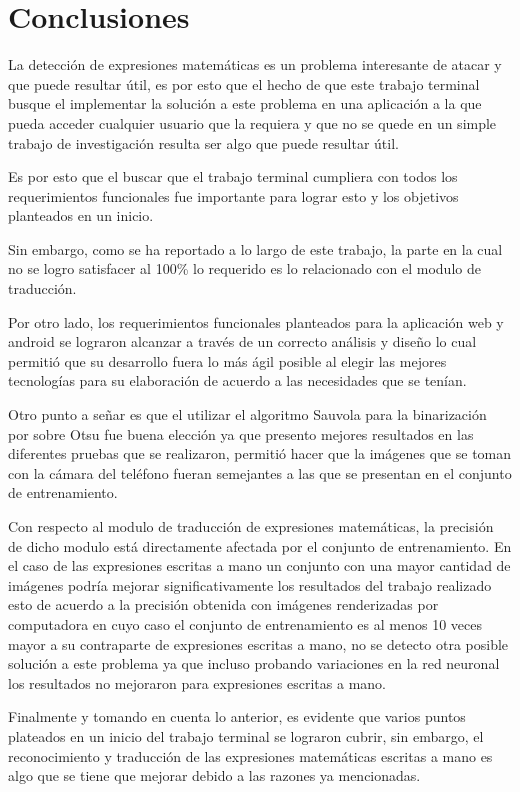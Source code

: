 \chapter{Conclusiones}
La detección de expresiones matemáticas es un problema interesante de atacar y que puede resultar útil, es por esto que el hecho de que este trabajo terminal busque el implementar la solución a este problema en una aplicación a la que pueda acceder cualquier usuario que la requiera y que no se quede en un simple trabajo de investigación resulta ser algo que puede resultar útil.

Es por esto que el buscar que el trabajo terminal cumpliera con todos los requerimientos funcionales fue importante para lograr esto y los objetivos planteados en un inicio.

Sin embargo, como se ha reportado a lo largo de este trabajo, la parte en la cual no se logro satisfacer al 100\% lo requerido es lo relacionado con el modulo de traducción.

Por otro lado, los requerimientos funcionales planteados para la aplicación web y  android se lograron alcanzar a través de un correcto análisis y diseño lo cual permitió que su desarrollo fuera lo más ágil posible al elegir las mejores tecnologías para su elaboración de acuerdo a las necesidades que se tenían.

Otro punto a señar es que el utilizar el algoritmo Sauvola para la binarización por sobre Otsu fue buena elección ya que presento mejores resultados en las diferentes pruebas que se realizaron, permitió hacer que la imágenes que se toman con la cámara del teléfono fueran semejantes a las que se presentan en el conjunto de entrenamiento.

Con respecto al modulo de traducción de expresiones matemáticas, la precisión de dicho modulo está directamente afectada por el conjunto de entrenamiento. En el caso de las expresiones escritas a mano un conjunto con una mayor cantidad de imágenes podría mejorar significativamente los resultados del trabajo realizado esto de acuerdo a la precisión obtenida con imágenes renderizadas por computadora en cuyo caso el conjunto de entrenamiento es al menos 10 veces mayor a su contraparte de expresiones escritas a mano, no se detecto otra posible solución a este problema ya que incluso probando variaciones en la red neuronal los resultados no mejoraron para expresiones escritas a mano.

Finalmente y tomando en cuenta lo anterior, es evidente que varios puntos plateados en un inicio del trabajo terminal se lograron cubrir, sin embargo, el reconocimiento y traducción de las expresiones matemáticas escritas a mano es algo que se tiene que mejorar debido a las razones ya mencionadas.

